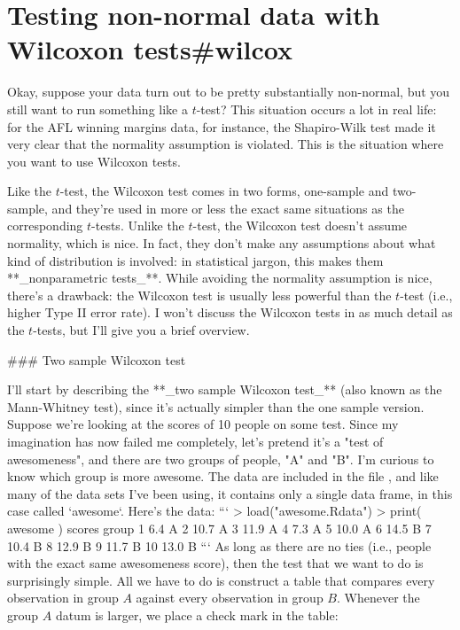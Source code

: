 \section{Testing non-normal data with Wilcoxon tests{#wilcox}}

Okay, suppose your data turn out to be pretty substantially non-normal, but you still want to run something like a $t$-test? This situation occurs a lot in real life: for the AFL winning margins data, for instance, the Shapiro-Wilk test made it very clear that the normality assumption is violated. This is the situation where you want to use Wilcoxon tests. 

Like the $t$-test, the Wilcoxon test comes in two forms, one-sample and two-sample, and they're used in more or less the exact same situations as the corresponding $t$-tests. Unlike the $t$-test, the Wilcoxon test doesn't assume normality, which is nice. In fact, they don't make any assumptions about what kind of distribution is involved: in statistical jargon, this makes them **_nonparametric tests_**. While avoiding the normality assumption is nice, there's a drawback: the Wilcoxon test is usually less powerful than the $t$-test (i.e., higher Type II error rate). I won't discuss the Wilcoxon tests in as much detail as the $t$-tests, but I'll give you a brief overview.


### Two sample Wilcoxon test

I'll start by describing the **_two sample Wilcoxon test_** (also known as the Mann-Whitney test), since it's actually simpler than the one sample version. Suppose we're looking at the scores of 10 people on some test. Since my imagination has now failed me completely, let's pretend it's a "test of awesomeness", and there are two groups of people, "A" and "B". I'm curious to know which group is more awesome. The data are included in the file , and like many of the data sets I've been using, it contains only a single data frame, in this case called `awesome`. Here's the data:
```
> load("awesome.Rdata")
> print( awesome )
   scores group
1     6.4     A
2    10.7     A
3    11.9     A
4     7.3     A
5    10.0     A
6    14.5     B
7    10.4     B
8    12.9     B
9    11.7     B
10   13.0     B
```
As long as there are no ties (i.e., people with the exact same awesomeness score), then the test that we want to do is surprisingly simple. All we have to do is construct a table that compares every observation in group $A$ against every observation in group $B$. Whenever the group $A$ datum is larger, we place a check mark in the table:


